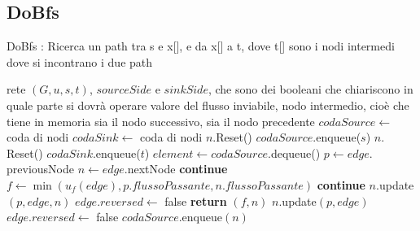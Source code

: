 \documentclass{article}
\begin{document}
\subsection{DoBfs}
\begin{algorithm}
    \caption{DoBfs : Ricerca un path tra s e x[], e da x[] a t, dove t[] sono i nodi intermedi dove si incontrano i due path}
    \begin{algorithmic}[1]
        \REQUIRE rete $(G,u,s,t)$, $sourceSide$ e $sinkSide$, che sono dei booleani che chiariscono in quale parte si dovrà operare
        \ENSURE valore del flusso inviabile, nodo intermedio, cioè che tiene in memoria sia il nodo successivo, sia il nodo precedente
        \STATE $codaSource \leftarrow$ coda di nodi
        \STATE $codaSink \leftarrow$ coda di nodi
        \STATE $n.$Reset()
        \ENDFOR
        \STATE $codaSource.$enqueue($s$)
        \ENDIF
        \STATE $n.$Reset()
        \ENDFOR
        \STATE $codaSink$.enqueue($t$)
        \ENDIF
        \STATE $element \leftarrow codaSource$.dequeue()
        \STATE $p \leftarrow edge.$previousNode
        \STATE $n \leftarrow edge.$nextNode
         
        \STATE \textbf{continue}
        \ELSE
        \STATE $f \leftarrow \min(u_f(edge),p.flussoPassante,n.flussoPassante)$
        \STATE \textbf{continue}
        \ENDIF
        \STATE $n.$update$(p,edge,n)$
        \STATE $edge.reversed \leftarrow$ false
        \STATE \textbf{return} $(f,n)$
        \ENDIF
        \ENDIF
        \STATE $n.$update$(p,edge)$
        \STATE $edge.reversed \leftarrow$ false
        \STATE $codaSource$.enqueue$(n)$
        \ENDIF
    \end{algorithmic}
\end{algorithm}
\newpage
\end{document}
